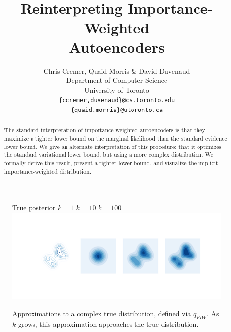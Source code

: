 \documentclass{article} %
\title{Reinterpreting Importance-Weighted \\Autoencoders}
\author{Chris Cremer, Quaid Morris \& David Duvenaud \\
Department of Computer Science\\
University of Toronto\\
\texttt{\{ccremer,duvenaud\}@cs.toronto.edu} \\
\texttt{\{quaid.morris\}@utoronto.ca}
}
\begin{document}
\maketitle

\begin{abstract}
The standard interpretation of importance-weighted autoencoders is that they maximize a tighter lower bound on the marginal likelihood than the standard evidence lower bound.
We give an alternate interpretation of this procedure: that it optimizes the standard variational lower bound, but using a more complex distribution. 
We formally derive this result, present a tighter lower bound, and visualize the implicit importance-weighted distribution.
\end{abstract}
 

\begin{figure}[b]
  \centering
   True posterior \qquad  \qquad $k=1$  \qquad \qquad \qquad $k=10$ \qquad \qquad \qquad $k=100$ \quad
      \includegraphics[width=1.\textwidth, clip, trim=2.5cm 3.9cm 2cm 3.6cm]{figs/figure_1.png}
  \vspace{-5mm}
  \caption{Approximations to a complex true distribution, defined via $q_{EIW}$.
  As $k$ grows, this approximation approaches the true distribution.}
  \label{viz1}
\end{figure}
\end{document}
